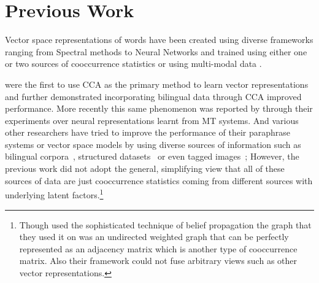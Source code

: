 \documentclass[11pt]{article}
\begin{document}
\section{Previous Work}
\label{sec:previouswork}
Vector space representations of words have been created using diverse
 frameworks ranging from Spectral methods
 \cite{dhillon2011multi,dhillon2012two}
 to Neural Networks
 \cite{mikolov2013efficient,mikolov2013distributed,collobert2013word}
 and trained using either one
 \cite{pennington2014glove}
 or two sources of cooccurrence statistics
 \cite{zou2013bilingual,faruqui2014improving,bansal2014tailoring,levy2014dependency}
 or using multi-modal data
 \cite{felix2014learning,bruni2012distributional}.
 
\cite{dhillon2011multi,dhillon2012two} were the first to use
CCA as the primary method to learn vector representations and
\cite{faruqui2014improving} further demonstrated incorporating bilingual
data through CCA improved performance. More recently this same
phenomenon was reported by  through their
experiments over neural representations learnt from MT systems.
And various other researchers have tried to improve the
performance of their paraphrase systems or vector space models by using
diverse sources of information such as bilingual
corpora~\cite{bannard2005paraphrasing,Huang2012Improving,zou2013bilingual}, 
structured datasets~\cite{yu2014improving,faruqui2014retrofitting} or even
tagged images~\cite{bruni2012distributional}; 
However, the previous
work did not adopt the general, simplifying view that 
all of these sources of data are just cooccurrence 
statistics coming from different sources with underlying latent
factors.\footnote{Though \cite{faruqui2014retrofitting} used
  the sophisticated technique of belief propagation the graph that
  they used it on was an undirected weighted graph that can be
  perfectly represented as an adjacency matrix which is another type of
cooccurrence matrix. Also their framework could not fuse arbitrary views such as
other vector representations.}
\end{document}
